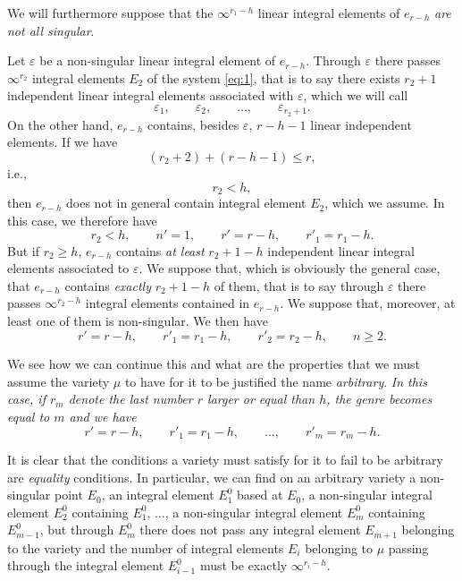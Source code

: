 \documentclass[leqno,11pt]{book}
\makeatletter
\theoremstyle{shape1}
\theoremstyle{shapesmall}
\let\old@epsilon\epsilon
\let\old@varepsilon\varepsilon
\let\epsilon\old@varepsilon
\let\varepsilon\old@epsilon
\makeatother
\begin{document}
We will furthermore suppose that the $\infty^{r_{1}-h}$ linear integral elements of $e_{r-h}$ \emph{are not all singular}.

Let $\epsilon$ be a non-singular linear integral element of $e_{r-h}$. Through $\epsilon$ there passes $\infty^{r_{2}}$ integral elements $E_{2}$ of the system \eqref{eq:1}, that is to say there exists $r_{2}+1$ independent linear integral elements associated with $\epsilon$, which we will call
\[
\epsilon_{1},\qquad\epsilon_{2},\qquad\dots,\qquad\epsilon_{r_{2}+1}.
\]
On the other hand, $e_{r-h}$ contains, besides $\epsilon$, $r-h-1$ linear independent elements. If we have
\[
(r_{2}+2)+(r-h-1)\le r,
\]
i.e.,
\[
r_{2}<h,
\]
then $e_{r-h}$ does not in general contain integral element $E_{2}$, which we assume. In this case, we therefore have
\[
r_{2}<h,\qquad n'=1,\qquad r'=r-h,\qquad r'_{1}=r_{1}-h.
\]
But if $r_{2}\ge h$, $e_{r-h}$ contains \emph{at least} $r_{2}+1-h$ independent linear integral elements associated to $\epsilon$. We suppose that, which is obviously the general case, that $e_{r-h}$ contains \emph{exactly} $r_{2}+1-h$ of them, that is to say through $\epsilon$ there passes $\infty^{r_{2}-h}$ integral elements contained in $e_{r-h}$. We suppose that, moreover, at least one of them is non-singular. We then have
\[
r'=r-h,\qquad r'_{1}=r_{1}-h,\qquad r'_{2}=r_{2}-h,\qquad n\ge 2.
\]

We see how we can continue this and what are the properties that we must assume the variety $\mu$ to have for it to be justified the name \emph{arbitrary}. \emph{In this case, if $r_{m}$ denote the last number $r$ larger or equal than $h$, the genre becomes equal to $m$ and we have}
\[
r'=r-h,\qquad r'_{1}=r_{1}-h,\qquad \dots,\qquad r'_{m}=r_{m}-h.
\]

It is clear that the conditions a variety must satisfy for it to fail to be arbitrary are \emph{equality} conditions. In particular, we can find on an arbitrary variety a non-singular point $E_{0}$, an integral element $E^{0}_{1}$ based at $E_{0}$, a non-singular integral element $E_{2}^{0}$ containing $E_{1}^{0}$, $\dots$, a non-singular integral element $E_{m}^{0}$ containing $E_{m-1}^{0}$, but through $E_{m}^{0}$ there does not pass any integral element $E_{m+1}$ belonging to the variety and the number of integral elements $E_{i}$ belonging to $\mu$ passing through the integral element $E_{i-1}^{0}$ must be exactly $\infty^{r_{i}-h}$.
\end{document}
